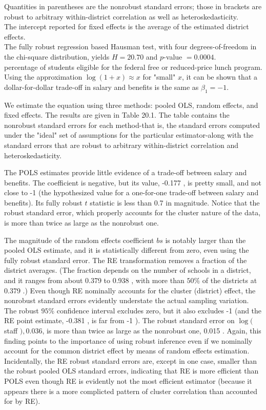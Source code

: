 \documentclass[10pt]{article}
\begin{document}
Quantities in parentheses are the nonrobust standard errors; those in brackets are robust to arbitrary within-district correlation as well as heteroskedasticity.\\
The intercept reported for fixed effects is the average of the estimated district effects.\\
The fully robust regression based Hausman test, with four degrees-of-freedom in the chi-square distribution, yields $H=20.70$ and $p$-value $=0.0004$.\\
percentage of students eligible for the federal free or reduced-price lunch program. Using the approximation $\log (1+x) \approx x$ for "small" $x$, it can be shown that a dollar-for-dollar trade-off in salary and benefits is the same as $\beta_{1}=-1$.

We estimate the equation using three methods: pooled OLS, random effects, and fixed effects. The results are given in Table 20.1. The table contains the nonrobust standard errors for each method-that is, the standard errors computed under the "ideal" set of assumptions for the particular estimator-along with the standard errors that are robust to arbitrary within-district correlation and heteroskedasticity.

The POLS estimates provide little evidence of a trade-off between salary and benefits. The coefficient is negative, but its value, -0.177 , is pretty small, and not close to -1 (the hypothesized value for a one-for-one trade-off between salary and benefits). Its fully robust $t$ statistic is less than 0.7 in magnitude. Notice that the robust standard error, which properly accounts for the cluster nature of the data, is more than twice as large as the nonrobust one.

The magnitude of the random effects coefficient $b s$ is notably larger than the pooled OLS estimate, and it is statistically different from zero, even using the fully robust standard error. The RE transformation removes a fraction of the district averages. (The fraction depends on the number of schools in a district, and it ranges from about 0.379 to 0.938 , with more than $50 \%$ of the districts at 0.379 .) Even though RE nominally accounts for the cluster (district) effect, the nonrobust standard errors evidently understate the actual sampling variation. The robust $95 \%$ confidence interval excludes zero, but it also excludes -1 (and the RE point estimate, -0.381 , is far from -1 ). The robust standard error on $\log ($ staff $), 0.036$, is more than twice as large as the nonrobust one, 0.015 . Again, this finding points to the importance of using robust inference even if we nominally account for the common district effect by means of random effects estimation. Incidentally, the RE robust standard errors are, except in one case, smaller than the robust pooled OLS standard errors, indicating that RE is more efficient than POLS even though RE is evidently not the most efficient estimator (because it appears there is a more complicted pattern of cluster correlation than accounted for by RE).
\end{document}
